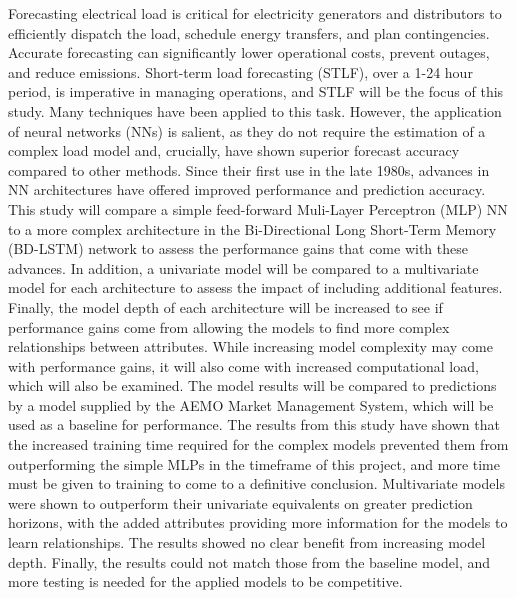 \documentclass[mstat,12pt]{unswthesis}
\begin{document}



\par



Forecasting electrical load is critical for electricity generators and distributors to efficiently dispatch the load, schedule energy transfers, and plan contingencies. Accurate forecasting can significantly lower operational costs, prevent outages, and reduce emissions. Short-term load forecasting (STLF), over a 1-24 hour period, is imperative in managing operations, and STLF will be the focus of this study. Many techniques have been applied to this task. However, the application of neural networks (NNs) is salient, as they do not require the estimation of a complex load model and, crucially, have shown superior forecast accuracy compared to other methods. Since their first use in the late 1980s, advances in NN architectures have offered improved performance and prediction accuracy. This study will compare a simple feed-forward Muli-Layer Perceptron (MLP) NN to a more complex architecture in the Bi-Directional Long Short-Term Memory (BD-LSTM) network to assess the performance gains that come with these advances. In addition, a univariate model will be compared to a multivariate model for each architecture to assess the impact of including additional features. Finally, the model depth of each architecture will be increased to see if performance gains come from allowing the models to find more complex relationships between attributes. While increasing model complexity may come with performance gains, it will also come with increased computational load, which will also be examined. The model results will be compared to predictions by a model supplied by the AEMO Market Management System, which will be used as a baseline for performance. The results from this study have shown that the increased training time required for the complex models prevented them from outperforming the simple MLPs in the timeframe of this project, and more time must be given to training to come to a definitive conclusion. Multivariate models were shown to outperform their univariate equivalents on greater prediction horizons, with the added attributes providing more information for the models to learn relationships. The results showed no clear benefit from increasing model depth. Finally, the results could not match those from the baseline model, and more testing is needed for the applied models to be competitive.
\end{document}
